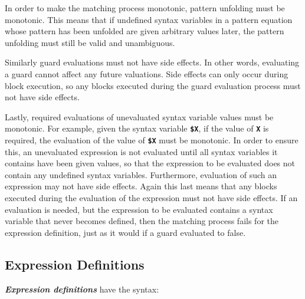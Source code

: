 \documentclass[12pt]{article}
\newcommand{\TT}[1]{{\tt \bfseries #1}}
\newcommand{\ikey}[2]{{\bf \em #1}\index{#2}}
\begin{document}
In order to make the matching process monotonic, pattern unfolding must
be monotonic.  This means that if undefined syntax variables in a pattern
equation whose pattern has been unfolded are given arbitrary values later,
the pattern unfolding must still be valid and unambiguous.

Similarly guard evaluations must not have side effects.  In other
words, evaluating a guard cannot affect any future valuations.
Side effects can only occur during block execution, so any blocks
executed during the guard evaluation process must not have side effects.

Lastly, required evaluations of unevaluated syntax variable values
must be monotonic.  For example, given the syntax variable \TT{\$X},
if the value of \TT{X} is required, the evaluation of the value of
\TT{\$X} must be monotonic.
In order to ensure this, an unevaluated expression is not evaluated until
all syntax variables it contains have been given values, so that
the expression to be evaluated does not contain any undefined syntax
variables.  Furthermore, evaluation of such an expression may not have
side effects.  Again this last means that any blocks executed during
the evaluation of the expression must not have side effects.
If an evaluation is needed, but the expression to be evaluated contains
a syntax variable that never becomes defined,
then the matching process fails for the expression definition, just as it
would if a guard evaluated to false.

\subsection{Expression Definitions}
\label{EXPRESSION-DEFINITION}

\ikey{Expression definitions}{expression definition} have the syntax:
\end{document}
